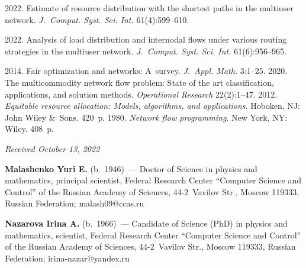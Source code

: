   


  \begin{multicols}{2}

\renewcommand{\bibname}{\protect\rmfamily References}

{\small\frenchspacing
 {%
 \begin{thebibliography}{9} 

 2022. Estimate of resource distribution with the shortest paths  in the multiuser network. 
 \textit{J.~Comput. Syst. Sci. Int.} 61(4):599--610.    
 
 2022. Analysis of load distribution and internodal flows under various routing strategies in the multiuser network. \textit{J.~Comput. Syst. Sci. Int.} 61(6):956--965.  
 
 2014. Fair optimization and networks: A~survey.  \textit{J.~Appl. Math.} 3:1--25.
 2020. The multicommodity network flow problem: State of the art classification, applications, and solution methods.  \textit{Operational Research} 22(2):1--47.
 2012. \textit{Equitable resource allocation: Models, algorithms, and applications}. Hoboken, NJ: John Wiley \&~Sons. 420~p.
 1980. \textit{Network flow programming}. New York, NY: Wiley. 408~p.
 \end{thebibliography}

 }
 }

\end{multicols}

\vspace*{-6pt}

\hfill{\small\textit{Received October 13, 2022}}

\Contr

\noindent
\textbf{Malashenko Yuri E.} (b.\ 1946)~--- 
Doctor of Science in physics and mathematics, principal scientist, Federal Research Center ``Computer Science and Control'' 
of the Russian Academy of Sciences, 44-2~Vavilov Str., Moscow 119333, Russian Federation; \mbox{malash09@ccas.ru} 

\vspace*{4pt}

\noindent
\textbf{Nazarova Irina A.} (b.\ 1966)~--- 
Candidate of Science (PhD) in physics and mathematics, scientist, Federal Research Center ``Computer Science and Control'' 
of the Russian Academy of Sciences, 44-2~Vavilov Str., Moscow 119333, Russian Federation; \mbox{irina-nazar@yandex.ru}


   
\label{end\stat}

\renewcommand{\bibname}{\protect\rm Литература} 